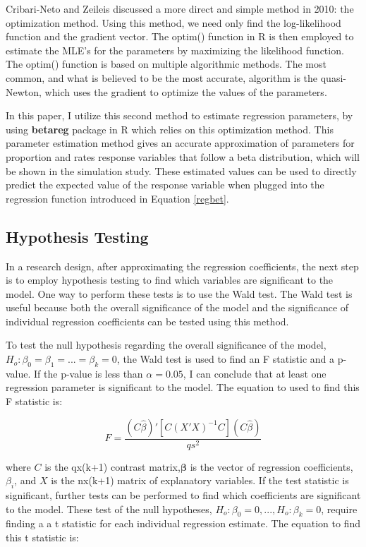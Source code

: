 \documentclass{svproc}
\begin{document}
Cribari-Neto and Zeileis discussed a more direct and simple method in 2010: the optimization method. Using this method, we need only find the log-likelihood function and the gradient vector. The optim() function in R is then employed to estimate the MLE's for the parameters by maximizing the likelihood function. The optim() function is based on multiple algorithmic methods. The most common, and what is believed to be the most accurate, algorithm is the quasi-Newton, which uses the gradient to optimize the values of the parameters. 

In this paper, I utilize this second method to estimate regression parameters, by using \textbf{betareg} package in R which relies on this optimization method. This parameter estimation method gives an accurate approximation of parameters for proportion and rates response variables that follow a beta distribution, which will be shown in the simulation study. These estimated values can be used to directly predict the expected value of the response variable when plugged into the regression function introduced in Equation \ref{regbet}.

\subsection{Hypothesis Testing}

In a research design, after approximating the regression coefficients, the next step is to employ hypothesis testing to find which variables are significant to the model. One way to perform these tests is to use the Wald test. The Wald test is useful because both the overall significance of the model and the significance of individual regression coefficients can be tested using this method.

To test the null hypothesis regarding the overall significance of the model, $H_o: \beta_0=\beta_1=...=\beta_k=0$, the Wald test is used to find an F statistic and a p-value. If the p-value is less than $\alpha=0.05$, I can conclude that at least one regression parameter is significant to the model. The equation to used to find this F statistic is:

\begin{equation}
F= \frac{(C \hat{\beta})'[C(X'X)^{-1}C](C \hat{\beta})}{qs^2}
\end{equation}

where $C$ is the qx(k+1) contrast matrix,$\bm{\beta}$ is the vector of regression coefficients, $\beta_i$, and $X$ is the nx(k+1) matrix of explanatory variables. If the test statistic is significant, further tests can be performed to find which coefficients are significant to the model. These test  of the null hypotheses, $H_o: \beta_0=0, ..., H_o: \beta_k=0$, require finding a a t statistic for each individual regression estimate. The equation to find this t statistic is:
\end{document}
